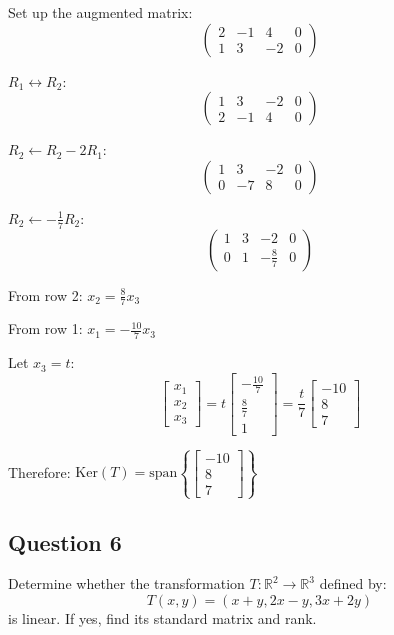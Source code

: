 \documentclass[12pt]{article}
\begin{document}
Set up the augmented matrix:
\[
	\left(\begin{array}{ccc|c}
		2 & -1 & 4 & 0 \\
		1 & 3 & -2 & 0
	\end{array}\right)
\]

$R_1 \leftrightarrow R_2$:
\[
	\left(\begin{array}{ccc|c}
		1 & 3 & -2 & 0 \\
		2 & -1 & 4 & 0
	\end{array}\right)
\]

$R_2 \leftarrow R_2 - 2R_1$:
\[
	\left(\begin{array}{ccc|c}
		1 & 3 & -2 & 0 \\
		0 & -7 & 8 & 0
	\end{array}\right)
\]

$R_2 \leftarrow -\frac{1}{7}R_2$:
\[
	\left(\begin{array}{ccc|c}
		1 & 3 & -2 & 0 \\
		0 & 1 & -\frac{8}{7} & 0
	\end{array}\right)
\]

From row 2: $x_2 = \frac{8}{7}x_3$

From row 1: $x_1 = -\frac{10}{7}x_3$

Let $x_3 = t$:
\[
	\begin{bmatrix}
		x_1 \\ x_2 \\ x_3
	\end{bmatrix} = t\begin{bmatrix}
		-\frac{10}{7} \\ \frac{8}{7} \\ 1
	\end{bmatrix} = \frac{t}{7}\begin{bmatrix}
		-10 \\ 8 \\ 7
	\end{bmatrix}
\]

Therefore: $\text{Ker}(T) = \text{span}\left\{\begin{bmatrix} -10 \\ 8 \\ 7 \end{bmatrix}\right\}$

\subsection*{Question 6}
Determine whether the transformation $T : \mathbb{R}^{2} \rightarrow \mathbb{R}^{3}$ defined by:
$$
T(x,y) = (x+y, 2x-y, 3x+2y)
$$
is linear. If yes, find its standard matrix and rank.
\end{document}
